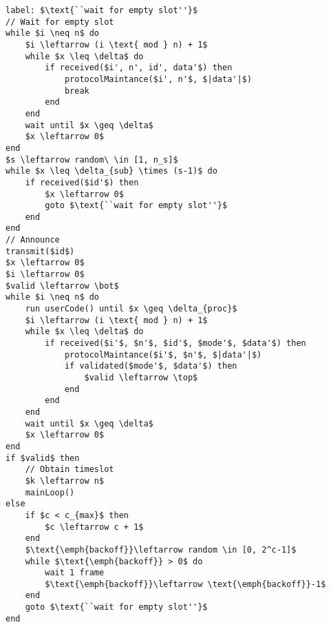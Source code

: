 \begin{lstlisting}[style=pseudocode, mathescape=true, float, floatplacement=p, caption={Modified section of initialise procedure}, label=lst:pseudoInitMulti]
label: $\text{``wait for empty slot''}$
// Wait for empty slot
while $i \neq n$ do
    $i \leftarrow (i \text{ mod } n) + 1$
    while $x \leq \delta$ do
        if received($i', n', id', data'$) then
            protocolMaintance($i', n'$, $|data'|$)
            break
        end
    end
    wait until $x \geq \delta$
    $x \leftarrow 0$
end
$s \leftarrow random\ \in [1, n_s]$
while $x \leq \delta_{sub} \times (s-1)$ do
    if received($id'$) then
        $x \leftarrow 0$
        goto $\text{``wait for empty slot''}$
    end
end
// Announce 
transmit($id$)
$x \leftarrow 0$
$i \leftarrow 0$
$valid \leftarrow \bot$
while $i \neq n$ do
    run userCode() until $x \geq \delta_{proc}$
    $i \leftarrow (i \text{ mod } n) + 1$
    while $x \leq \delta$ do
        if received($i'$, $n'$, $id'$, $mode'$, $data'$) then
            protocolMaintance($i'$, $n'$, $|data'|$)
            if validated($mode'$, $data'$) then
                $valid \leftarrow \top$
            end    
        end
    end
    wait until $x \geq \delta$
    $x \leftarrow 0$
end
if $valid$ then
    // Obtain timeslot
    $k \leftarrow n$
    mainLoop()
else
    if $c < c_{max}$ then
        $c \leftarrow c + 1$
    end
    $\text{\emph{backoff}}\leftarrow random \in [0, 2^c-1]$
    while $\text{\emph{backoff}} > 0$ do
        wait 1 frame
        $\text{\emph{backoff}}\leftarrow \text{\emph{backoff}}-1$ 
    end
    goto $\text{``wait for empty slot''}$
end
\end{lstlisting}


